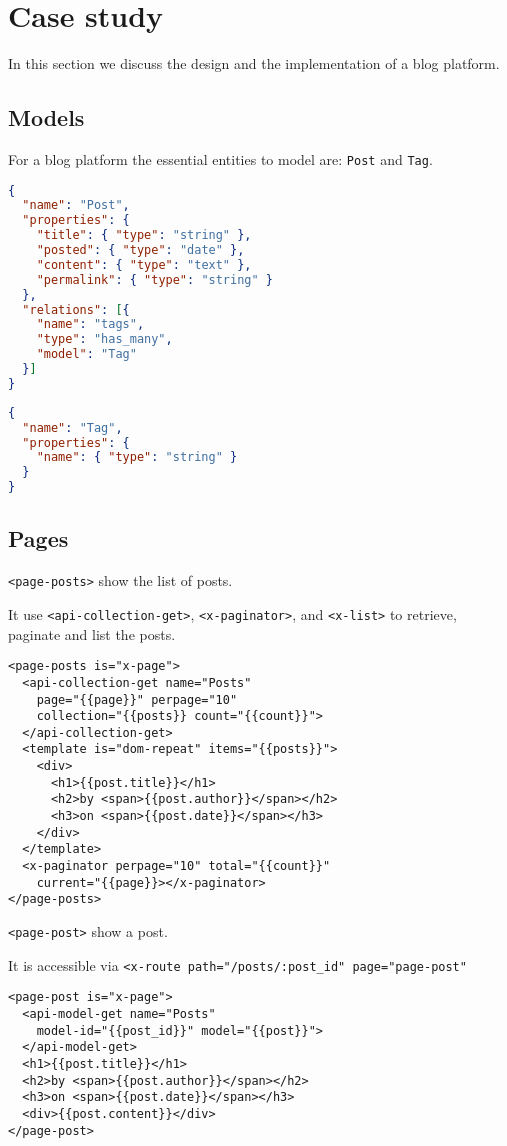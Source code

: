 \section{Case study}
In this section we discuss the design and the implementation of a blog platform. 

\subsection{Models}

For a blog platform the essential entities to model are: \texttt{Post} and \texttt{Tag}.

\begin{lstlisting}[language=json]
{
  "name": "Post",
  "properties": {
    "title": { "type": "string" },
    "posted": { "type": "date" },
    "content": { "type": "text" },
    "permalink": { "type": "string" }
  }, 
  "relations": [{
    "name": "tags", 
    "type": "has_many", 
    "model": "Tag"
  }]
}
\end{lstlisting}

\begin{lstlisting}[language=json]
{
  "name": "Tag",
  "properties": {
    "name": { "type": "string" }
  }
}
\end{lstlisting}


\subsection{Pages}

\texttt{<page-posts>} show the list of posts.

It use \texttt{<api-collection-get>}, \texttt{<x-paginator>}, and \texttt{<x-list>} to retrieve, paginate and list the posts.

\begin{lstlisting}[language=HTML5]
<page-posts is="x-page">
  <api-collection-get name="Posts"
    page="{{page}}" perpage="10"
    collection="{{posts}} count="{{count}}">
  </api-collection-get>
  <template is="dom-repeat" items="{{posts}}">
    <div>
      <h1>{{post.title}}</h1>
      <h2>by <span>{{post.author}}</span></h2>
      <h3>on <span>{{post.date}}</span></h3>
    </div>
  </template>
  <x-paginator perpage="10" total="{{count}}" 
    current="{{page}}></x-paginator>
</page-posts>
\end{lstlisting}

\texttt{<page-post>} show a post. 

It is accessible via \texttt{<x-route path="/posts/:post\_id" page="page-post"}

\begin{lstlisting}[language=HTML5]
<page-post is="x-page">
  <api-model-get name="Posts" 
    model-id="{{post_id}}" model="{{post}}">
  </api-model-get>
  <h1>{{post.title}}</h1>
  <h2>by <span>{{post.author}}</span></h2>
  <h3>on <span>{{post.date}}</span></h3>
  <div>{{post.content}}</div>
</page-post>
\end{lstlisting}
